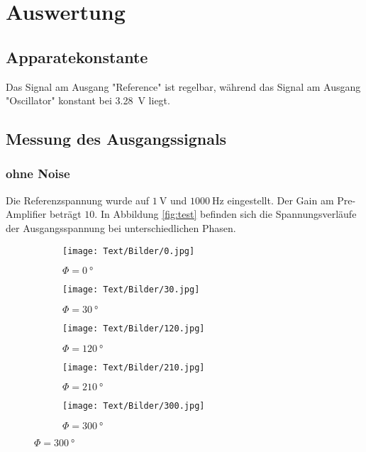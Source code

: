 \section{Auswertung}

\subsection{Apparatekonstante}

Das Signal am Ausgang "Reference" ist regelbar, während das Signal am Ausgang "Oscillator" konstant bei
\SI{3,28}{\V} liegt.

\subsection{Messung des Ausgangssignals}

\subsubsection{ohne Noise \label{sec:knoise}}

Die Referenzspannung wurde auf $\SI{1}{\V}$ und $\SI{1000}{\Hz}$ eingestellt. Der Gain am Pre-Amplifier beträgt $10$.
In Abbildung \ref{fig:test} befinden sich die Spannungsverläufe der Ausgangsspannung bei unterschiedlichen Phasen.
\begin{figure}[H]
  \caption{Spannungsverläufe in Abhängigkeit von der Phase}
  \label{fig:test}
  \centering
        \begin{subfigure}[b]{0.48\textwidth}
                \centering
                \texttt{[image: Text/Bilder/0.jpg]}
                \caption{$\Phi = \SI{0}{°}$}
                \label{fig:gull}
        \end{subfigure}
        \quad
        \begin{subfigure}[b]{0.48\textwidth}
                \centering
                \texttt{[image: Text/Bilder/30.jpg]}
                \caption{$\Phi = \SI{30}{°}$}
                \label{fig:gull2}
        \end{subfigure}
        \par\bigskip
        \begin{subfigure}[b]{0.48\textwidth}
                \centering
                \texttt{[image: Text/Bilder/120.jpg]}
                \caption{$\Phi = \SI{120}{°}$}
                \label{fig:gull3}
        \end{subfigure}
        \quad
        \begin{subfigure}[b]{0.48\textwidth}
                \centering
                \texttt{[image: Text/Bilder/210.jpg]}
                \caption{$\Phi = \SI{210}{°}$}
                \label{fig:gull4}
        \end{subfigure}
        \par\bigskip
        \begin{subfigure}[b]{0.48\textwidth}
                \centering
                \texttt{[image: Text/Bilder/300.jpg]}
                \caption{$\Phi = \SI{300}{°}$}
                \label{fig:gull5}
        \end{subfigure}
\end{figure}

